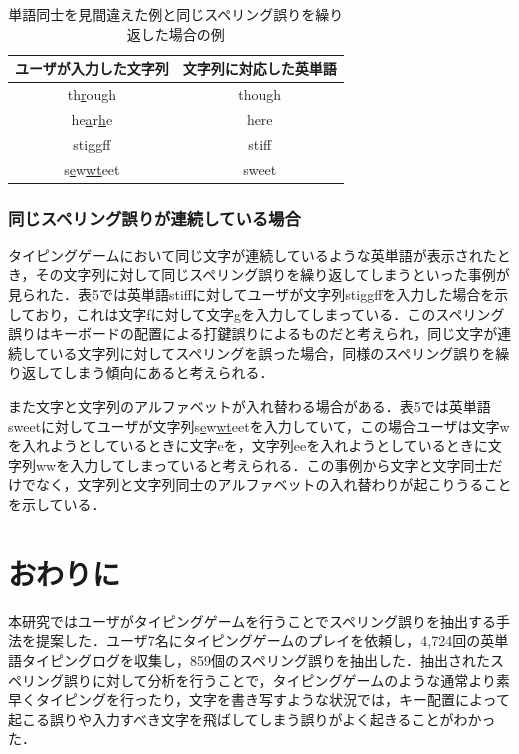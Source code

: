 \documentclass{jarticle}
\begin{document}
 \begin{table}[t]
  \small
   \centering
   \caption{単語同士を見間違えた例と同じスペリング誤りを繰り返した場合の例}
   \begin{tabular}{|c|c|} \hline
       	ユーザが入力した文字列 & 文字列に対応した英単語\\ \hline
	    th\underline{r}ough & though\\ \hline
	    he\underline{a}r\underline{h}e & here\\ \hline
	    sti\underline{gg}ff & stiff\\ \hline
	    s\underline{e}w\underline{wt}eet & sweet\\ \hline
   \end{tabular}
 \end{table}

\subsubsection{同じスペリング誤りが連続している場合}
タイピングゲームにおいて同じ文字が連続しているような英単語が表示されたとき，その文字列に対して同じスペリング誤りを繰り返してしまうといった事例が見られた．表5では英単語stiffに対してユーザが文字列sti\underline{gg}ffを入力した場合を示しており，これは文字fに対して文字gを入力してしまっている．このスペリング誤りはキーボードの配置による打鍵誤りによるものだと考えられ，同じ文字が連続している文字列に対してスペリングを誤った場合，同様のスペリング誤りを繰り返してしまう傾向にあると考えられる．

また文字と文字列のアルファベットが入れ替わる場合がある．表5では英単語sweetに対してユーザが文字列s\underline{e}w\underline{wt}eetを入力していて，この場合ユーザは文字wを入れようとしているときに文字eを，文字列eeを入れようとしているときに文字列wwを入力してしまっていると考えられる．この事例から文字と文字同士だけでなく，文字列と文字列同士のアルファベットの入れ替わりが起こりうることを示している．

\section{おわりに}
本研究ではユーザがタイピングゲームを行うことでスペリング誤りを抽出する手法を提案した．ユーザ7名にタイピングゲームのプレイを依頼し，4,724回の英単語タイピングログを収集し，859個のスペリング誤りを抽出した．抽出されたスペリング誤りに対して分析を行うことで，タイピングゲームのような通常より素早くタイピングを行ったり，文字を書き写すような状況では，キー配置によって起こる誤りや入力すべき文字を飛ばしてしまう誤りがよく起きることがわかった．
\end{document}
